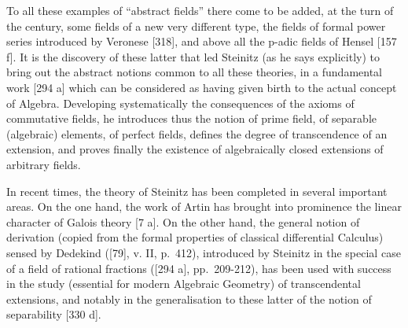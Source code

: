 To all these examples of ``abstract fields'' there come to be added, at the turn of the century, some fields of a new very different type, the fields of formal power series introduced by Veronese {[}318{]}, and above all the p-adic fields of Hensel {[}157 f{]}. It is the discovery of these latter that led Steinitz (as he says explicitly) to bring out the abstract notions common to all these theories, in a fundamental work {[}294 a{]} which can be considered as having given birth to the actual concept of Algebra. Developing systematically the consequences of the axioms of commutative fields, he introduces thus the notion of prime field, of separable (algebraic) elements, of perfect fields, defines the degree of transcendence of an extension, and proves finally the existence of algebraically closed extensions of arbitrary fields.

In recent times, the theory of Steinitz has been completed in several important areas. On the one hand, the work of Artin has brought into prominence the linear character of Galois theory {[}7 a{]}. On the other hand, the general notion of derivation (copied from the formal properties of classical differential Calculus) sensed by Dedekind ({[}79{]}, v. II, p.~412), introduced by Steinitz in the special case of a field of rational fractions ({[}294 a{]}, pp.~209-212), has been used with success in the study (essential for modern Algebraic Geometry) of transcendental extensions, and notably in the generalisation to these latter of the notion of separability {[}330 d{]}.

